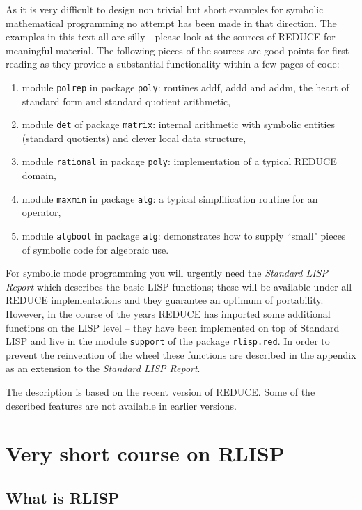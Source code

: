 \documentclass[11pt]{article}
\newcommand{\reduce}{\small REDUCE}
\begin{document}
As it is very difficult to design non trivial but short
examples for symbolic mathematical programming no
attempt has been made in that direction. The examples
in this text all are silly - please look at the
sources of {\reduce} for meaningful material. The following pieces
of the sources are good points for first reading as they
provide a substantial functionality within a few pages
of code:
\begin{enumerate}
\item module {\tt polrep} in package {\tt poly}: routines
   addf, addd and addm, the heart of standard form and
   standard quotient arithmetic,
\item module {\tt det} of package {\tt matrix}: internal
   arithmetic with symbolic entities (standard quotients)
   and clever local data structure,
\item module {\tt rational} in package {\tt poly}: implementation
   of a typical {\reduce} domain,
\item module {\tt maxmin} in package {\tt alg}: a typical
   simplification routine for an operator,
\item module {\tt algbool} in package {\tt alg}: demonstrates
   how to supply ``small" pieces of symbolic code for
   algebraic use.
\end{enumerate}

For symbolic mode programming you will urgently need the
{\em Standard LISP Report} which describes
the basic LISP functions; these will be available under all
{\reduce} implementations and they guarantee an optimum
of portability. However, in the course of the
years {\reduce} has imported some additional functions on the
LISP level -- they have been implemented on top of Standard LISP
and live in the module {\tt support} of 
the package {\tt rlisp.red}.
In order to prevent the reinvention of the wheel these functions
are described in the appendix as an extension to the
{\em Standard LISP Report}.

The description is based on the recent version of REDUCE. Some of the
described features are not available in earlier versions.
\section{Very short course on RLISP}

\subsection{What is RLISP}
\end{document}
